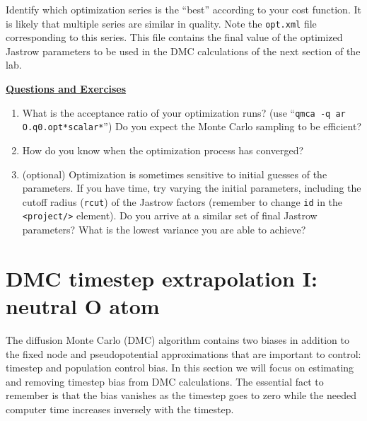 Identify which optimization series is the ``best'' according to your cost function.  It is likely that multiple series are similar in quality.  Note the \texttt{opt.xml} file corresponding to this series.  This file contains the final value of the optimized Jastrow parameters to be used in the DMC calculations of the next section of the lab.  

\vspace{1cm}
\begin{flushleft}
\textbf{\underline{Questions and Exercises}}
\end{flushleft}
\begin{enumerate}
  \item{What is the acceptance ratio of your optimization runs? (use ``\verb|qmca -q ar O.q0.opt*scalar*|'')  Do you expect the Monte Carlo sampling to be efficient?}
  \item{How do you know when the optimization process has converged?}
  \item{(optional) Optimization is sometimes sensitive to initial guesses of the parameters.  If you have time, try varying the initial parameters, including the cutoff radius (\texttt{rcut}) of the Jastrow factors (remember to change \texttt{id} in the \texttt{<project/>} element).  Do you arrive at a similar set of final Jastrow parameters?  What is the lowest variance you are able to achieve?}
\end{enumerate}



\section{DMC timestep extrapolation I: neutral O atom}
The diffusion Monte Carlo (DMC) algorithm contains two biases in addition to the fixed node and pseudopotential approximations that are important to control: timestep and population control bias.  In this section we will focus on estimating and removing timestep bias from DMC calculations.  The essential fact to remember is that the bias vanishes as the timestep goes to zero while the needed computer time increases inversely with the timestep.   


